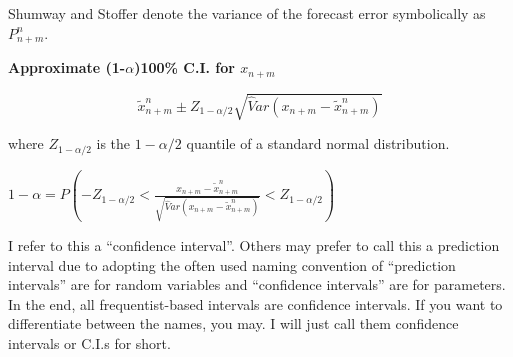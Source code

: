 \documentclass[
]{book}
\theoremstyle{definition}
\theoremstyle{definition}
\theoremstyle{definition}
\theoremstyle{definition}
\theoremstyle{remark}
\begin{document}
Shumway and Stoffer denote the variance of the forecast error symbolically as \(P^n_{n+m}\).

\textbf{Approximate (1-\(\alpha\))100\% C.I. for \(x_{n+m}\)}

\[\tilde x^n_{n+m} \pm Z_{1-\alpha/2}\sqrt{ \hat Var(x_{n+m}-\tilde x^n_{n+m})}\]

where \(Z_{1-\alpha/2}\) is the \(1-\alpha/2\) quantile of a standard normal distribution.

\(1-\alpha=P(-Z_{1-\alpha/2}< \frac{x_{n+m}-\tilde x^n_{n+m}}{\sqrt{\hat Var(x_{n+m}-\tilde x^n_{n+m})}}<Z_{1-\alpha/2})\)

I refer to this a ``confidence interval''. Others may prefer to call this a prediction interval due to adopting the often used naming convention of ``prediction intervals'' are for random variables and ``confidence intervals'' are for parameters. In the end, all frequentist-based intervals are confidence intervals. If you want to differentiate between the names, you may. I will just call them confidence intervals or C.I.s for short.
\end{document}
